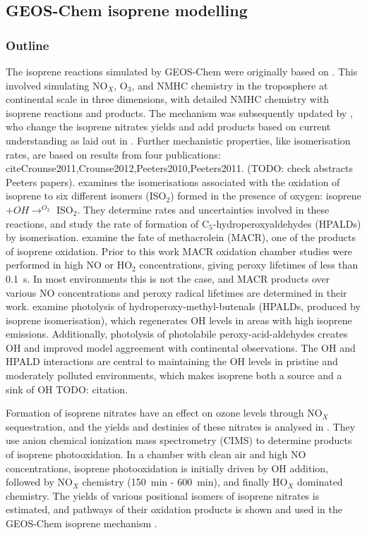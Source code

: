   \subsection{GEOS-Chem isoprene modelling}
  \label{Model:GC:Isop}
    \subsubsection{Outline}
      The isoprene reactions simulated by GEOS-Chem were originally based on \cite{Horowitz1998}.
      This involved simulating NO$_X$, O$_3$, and NMHC chemistry in the troposphere at continental scale in three dimensions, with detailed NMHC chemistry with isoprene reactions and products.
      The mechanism was subsequently updated by \citet{Mao2013}, who change the isoprene nitrates yields and add products based on current understanding as laid out in \citet{Paulot2009a,Paulot2009b}.
      Further mechanistic properties, like isomerisation rates, are based on results from four publications: cite{Crounse2011,Crounse2012,Peeters2010,Peeters2011}.
      (TODO: check abstracts Peeters papers).
      \cite{Crounse2011} examines the isomerisations associated with the oxidation of isoprene to six different isomers (ISO$_2$) formed in the presence of oxygen: isoprene $ + OH \rightarrow^{O_2} $ ISO$_2$.
      They determine rates and uncertainties involved in these reactions, and study the rate of formation of C$_5$-hydroperoxyaldehydes (HPALDs) by isomerisation.
      \cite{Crounse2012} examine the fate of methacrolein (MACR), one of the products of isoprene oxidation. 
      Prior to this work MACR oxidation chamber studies were performed in high NO or HO$_2$ concentrations, giving peroxy lifetimes of less than 0.1~s.
      In most environments this is not the case, and MACR products over various NO concentrations and peroxy radical lifetimes are determined in their work.
      \cite{Peeters2010} examine photolysis of hydroperoxy-methyl-butenals (HPALDs, produced by isoprene isomerisation), which regenerates OH levels in areas with high isoprene emissions.
      Additionally, photolysis of photolabile peroxy-acid-aldehydes creates OH and improved model aggreement with continental observations.
      The OH and HPALD interactions are central to maintaining the OH levels in pristine and moderately polluted environments, which makes isoprene both a source and a sink of OH TODO: citation.
      
      Formation of isoprene nitrates have an effect on ozone levels through NO$_X$ sequestration, and the yields and destinies of these nitrates is analysed in \citet{Paulot2009a}. 
      They use anion chemical ionization mass spectrometry (CIMS) to determine products of isoprene photooxidation.
      In a chamber with clean air and high NO concentrations, isoprene photooxidation is initially driven by OH addition, followed by NO$_X$ chemistry (150~min - 600~min), and finally HO$_X$ dominated chemistry.
      The yields of various positional isomers of isoprene nitrates is estimated, and pathways of their oxidation products is shown and used in the GEOS-Chem isoprene mechanism \citep{Paulot2009a,Mao2013}. 
      
